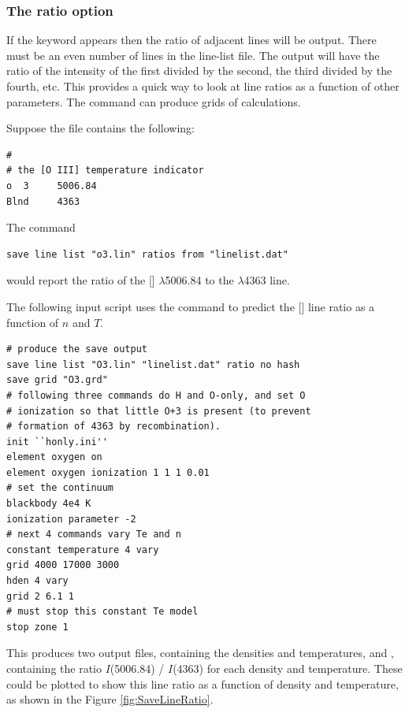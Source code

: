 \subsubsection{The ratio option}
If the keyword  appears then the ratio of adjacent
lines will be output.
There must be an even number of lines in the line-list file.
The output will have the ratio of the intensity of the first divided
by the second, the third divided by the fourth, etc.
This provides a quick way to look at line ratios as a function
of other parameters.
The  command can produce grids of calculations.

Suppose the file  contains the following:
\begin{verbatim}
#
# the [O III] temperature indicator
o  3     5006.84
Blnd     4363
\end{verbatim}
The command
\begin{verbatim}
save line list "o3.lin" ratios from "linelist.dat"
\end{verbatim}
would report the ratio of the [\oiii] $\lambda$5006.84 to the $\lambda$4363 line.

The following input script
uses the  command to predict the [\oiii] line ratio as a function of
$n$ and $T$.
\begin{verbatim}
# produce the save output
save line list "O3.lin" "linelist.dat" ratio no hash
save grid "O3.grd"
# following three commands do H and O-only, and set O
# ionization so that little O+3 is present (to prevent
# formation of 4363 by recombination).
init ``honly.ini''
element oxygen on
element oxygen ionization 1 1 1 0.01
# set the continuum
blackbody 4e4 K
ionization parameter -2
# next 4 commands vary Te and n
constant temperature 4 vary
grid 4000 17000 3000
hden 4 vary
grid 2 6.1 1
# must stop this constant Te model
stop zone 1
\end{verbatim}
This produces two output files, 
containing the densities and temperatures,
and , containing the ratio $I$(5006.84) / $I$(4363)
for each density and temperature.
These could be plotted to show this line ratio
as a function of density and temperature,
as shown in the Figure \ref{fig:SaveLineRatio}.

